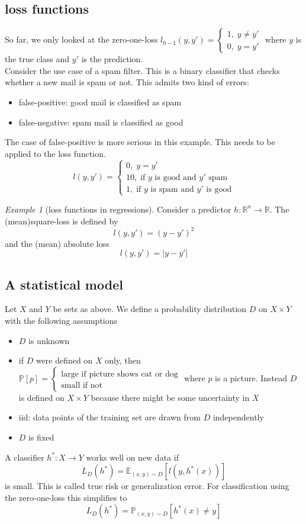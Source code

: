 \documentclass[a4paper, 12pt]{article}
\theoremstyle{plain}
\theoremstyle{definition}
\theoremstyle{lemma}
\theoremstyle{remark}
\theoremstyle{example}
\newtheorem{example}[theorem]{Example}
\begin{document}
	\subsection{loss functions}
	So far, we only looked at the zero-one-loss $l_{0-1}(y,y') = \begin{cases}
		1, \; y \neq y'\\
		0, \; y = y'
	\end{cases}$ where $y$ is the true class and $y'$ is the prediction.\\
	Consider the use case of a spam filter. This is a binary classifier that checks whether a new mail is spam or not. This admits two kind of errors: \begin{itemize}
		\item false-positive: good mail is classified as spam
		\item false-negative: spam mail is classified as good
	\end{itemize}
	The case of false-positive is more serious in this example. This needs to be applied to the loss function. \[l(y,y') = \begin{cases}
		0, \; y=y'\\
		10, \; \text{if $y$ is good and $y'$ spam}\\
		1, \; \text{if $y$ is spam and $y'$ is good}
	\end{cases}\]
	\begin{example}[loss functions in regressions]
		Consider a predictor $h: \mathbb{R}^n \to \mathbb{R}$. The (mean)square-loss is defined by \[l(y,y') = (y-y')^2\] and the (mean) absolute loss \[l(y,y') = \left|y-y'\right|\]
	\end{example}
	\subsection{A statistical model}
	Let $X$ and $Y$ be sets as above. We define a probability distribution $D$ on $X\times Y$ with the following assumptions \begin{itemize}
		\item $D$ is unknown
		\item if $D$ were defined on $X$ only, then $\mathbb{P}[p] = \begin{cases}
			\text{large if picture shows cat or dog}\\
			\text{small if not}
		\end{cases}$ where $p$ is a picture. Instead $D$ is defined on $X\times Y$ because there might be some uncertainty in $X$\\
		\item iid: data points of the training set are drawn from $D$ independently
		\item $D$ is fixed 
	\end{itemize}
	A classifier $h^*: X \to Y$ works well on new data if \[L_D(h^*) = \mathbb{E}_{(x,y)\sim D}[l(y,h^*(x))]\] is small. This is called true risk or generalization error. For classification using the zero-one-loss this simplifies to \[L_D(h^*) = \mathbb{P}_{(x,y)\sim D}[h^*(x)\neq y]\]
\end{document}
